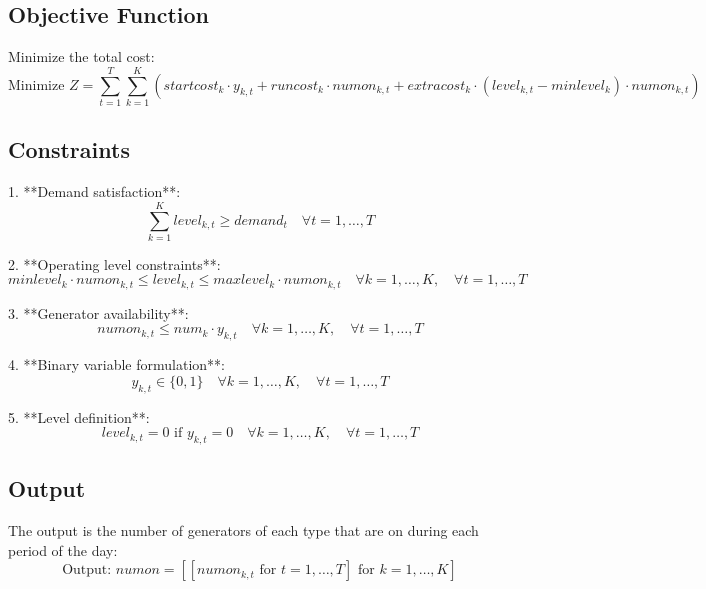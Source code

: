 \documentclass{article}
\begin{document}
\subsection*{Objective Function}
Minimize the total cost:
\[
\text{Minimize } Z = \sum_{t=1}^{T} \sum_{k=1}^{K} \left( startcost_k \cdot y_{k,t} + runcost_k \cdot numon_{k,t} + extracost_k \cdot (level_{k,t} - minlevel_k) \cdot numon_{k,t} \right)
\]

\subsection*{Constraints}

1. **Demand satisfaction**:
\[
\sum_{k=1}^{K} level_{k,t} \geq demand_t \quad \forall t = 1, \ldots, T
\]

2. **Operating level constraints**:
\[
minlevel_k \cdot numon_{k,t} \leq level_{k,t} \leq maxlevel_k \cdot numon_{k,t} \quad \forall k = 1, \ldots, K, \quad \forall t = 1, \ldots, T
\]

3. **Generator availability**:
\[
numon_{k,t} \leq num_k \cdot y_{k,t} \quad \forall k = 1, \ldots, K, \quad \forall t = 1, \ldots, T
\]

4. **Binary variable formulation**:
\[
y_{k,t} \in \{0, 1\} \quad \forall k = 1, \ldots, K, \quad \forall t = 1, \ldots, T
\]

5. **Level definition**:
\[
level_{k,t} = 0 \text{ if } y_{k,t} = 0 \quad \forall k = 1, \ldots, K, \quad \forall t = 1, \ldots, T
\]

\subsection*{Output}
The output is the number of generators of each type that are on during each period of the day:
\[
\text{Output: } numon = [[numon_{k,t} \text{ for } t = 1,\ldots,T] \text{ for } k = 1,\ldots,K]
\]
\end{document}
